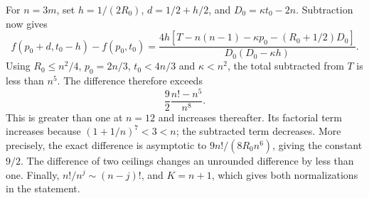 For $n=3m$, set $h=1/(2R_0)$, $d=1/2+h/2$, and
$D_0=\kappa t_0-2n$. Subtraction now gives
\[
 f(p_0+d,t_0-h)-f(p_0,t_0)
 =\frac{4h[T-n(n-1)-\kappa p_0-(R_0+1/2)D_0]}
 {D_0(D_0-\kappa h)}.
\]
Using $R_0\le n^2/4$, $p_0=2n/3$, $t_0<4n/3$ and
$\kappa<n^2$, the total subtracted from $T$ is less than $n^5$.
The difference therefore exceeds
\[
 \frac92\frac{n!-n^5}{n^8}.
\]
This is greater than one at $n=12$ and increases thereafter.
Its factorial term increases because $(1+1/n)^7<3<n$; the
subtracted term decreases. More precisely, the exact difference
is asymptotic to $9n!/(8R_0n^6)$, giving the constant $9/2$.
The difference of two ceilings changes an unrounded difference by
less than one. Finally, $n!/n^j\sim(n-j)!$, and $K=n+1$,
which gives both normalizations in the statement.
